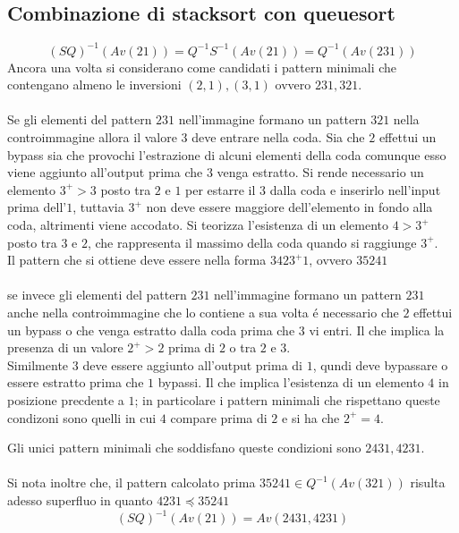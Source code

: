 \subsection*{Combinazione di {stacksort} con {queuesort}}
$$(SQ)^{-1}(Av(21))=Q^{-1}S^{-1}(Av(21))=Q^{-1}(Av(231))$$Ancora una volta si considerano come candidati i pattern minimali che contengano almeno le inversioni $(2,1),(3,1)$ ovvero $231,321$.\\\\
Se gli elementi del pattern $231$ nell'immagine formano un pattern $321$ nella controimmagine allora il valore $3$ deve entrare nella coda. Sia che $2$ effettui un bypass sia che provochi l'estrazione di alcuni elementi della coda comunque esso viene aggiunto all'output prima che $3$ venga estratto. Si rende necessario un elemento $3^+>3$ posto tra $2$ e $1$ per estarre il $3$ dalla coda e inserirlo nell'input prima dell'$1$, tuttavia $3^+$ non deve essere maggiore dell'elemento in fondo alla coda, altrimenti viene accodato. Si teorizza l'esistenza di un elemento $4>3^+$ posto tra $3$ e $2$, che rappresenta il massimo della coda quando si raggiunge $3^+$.\\
Il pattern che si ottiene deve essere nella forma $3423^+1$, ovvero $35241$\\\\
se invece gli elementi del pattern $231$ nell'immagine formano un pattern $231$ anche nella controimmagine che lo contiene a sua volta \'e necessario che $2$ effettui un bypass o che venga estratto dalla coda prima che $3$ vi entri. Il che implica la presenza di un valore $2^+>2$ prima di $2$ o tra $2$ e $3$.\\Similmente $3$ deve essere aggiunto all'output prima di $1$, qundi deve bypassare o essere estratto prima che $1$ bypassi. Il che implica l'esistenza di un elemento $4$ in posizione precdente a $1$; in particolare i pattern minimali che rispettano queste condizoni sono quelli in cui $4$ compare prima di $2$ e si ha che $2^+=4$.\\
\begin{center}
\end{center}
Gli unici pattern minimali che soddisfano queste condizioni sono $2431,4231$.
\\\\Si nota inoltre che, il pattern calcolato prima $35241\in Q^{-1}(Av(321))$ risulta adesso superfluo in quanto $4231\preceq35241$
$$(SQ)^{-1}(Av(21))=Av(2431,4231)$$

